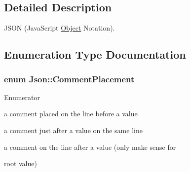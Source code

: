 \subsection{Detailed Description}
J\+S\+O\+N (Java\+Script \hyperlink{class_object}{Object} Notation). 

\subsection{Enumeration Type Documentation}
\hypertarget{namespace_json_a4fc417c23905b2ae9e2c47d197a45351}{
\subsubsection[{Comment\+Placement}]{\setlength{\rightskip}{0pt plus 5cm}enum {\bf Json\+::\+Comment\+Placement}}}\label{namespace_json_a4fc417c23905b2ae9e2c47d197a45351}
\begin{Desc}
\item[Enumerator]\par
\begin{description}
\item[{\em 
\hypertarget{namespace_json_a4fc417c23905b2ae9e2c47d197a45351a52f1733775460517b2ea6bedf4906d52}{comment\+Before}\label{namespace_json_a4fc417c23905b2ae9e2c47d197a45351a52f1733775460517b2ea6bedf4906d52}
}]a comment placed on the line before a value \item[{\em 
\hypertarget{namespace_json_a4fc417c23905b2ae9e2c47d197a45351a008a230a0586de54f30b76afe70fdcfa}{comment\+After\+On\+Same\+Line}\label{namespace_json_a4fc417c23905b2ae9e2c47d197a45351a008a230a0586de54f30b76afe70fdcfa}
}]a comment just after a value on the same line \item[{\em 
\hypertarget{namespace_json_a4fc417c23905b2ae9e2c47d197a45351ac5784ca53b12250888ddb642b06aebef}{comment\+After}\label{namespace_json_a4fc417c23905b2ae9e2c47d197a45351ac5784ca53b12250888ddb642b06aebef}
}]a comment on the line after a value (only make sense for \item[{\em 
\hypertarget{namespace_json_a4fc417c23905b2ae9e2c47d197a45351abcbd3eb00417335e094e4a03379659b5}{number\+Of\+Comment\+Placement}\label{namespace_json_a4fc417c23905b2ae9e2c47d197a45351abcbd3eb00417335e094e4a03379659b5}
}]root value) \end{description}
\end{Desc}
